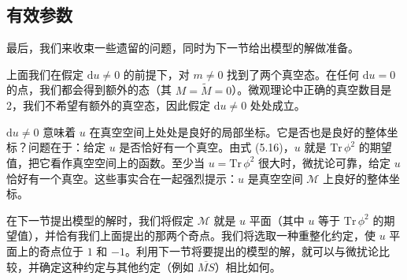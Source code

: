 \documentclass[11pt,a4paper,UTF8,fontset=fandol]{ctexart}
\theoremstyle{plain}
\theoremstyle{definition}
\begin{document}
\subsection{有效参数}

最后，我们来收束一些遗留的问题，同时为下一节给出模型的解做准备。

上面我们在假定 $\mathrm{d}u\neq 0$ 的前提下，对 $m\neq 0$ 找到了两个真空态。在任何 $\mathrm{d}u=0$ 的点，我们都会得到额外的态（其 $M=\widetilde M=0$）。微观理论中正确的真空数目是 2，我们不希望有额外的真空态，因此假定 $\mathrm{d}u\neq 0$ 处处成立。

$\mathrm{d}u\neq 0$ 意味着 $u$ 在真空空间上处处是良好的局部坐标。它是否也是良好的整体坐标？问题在于：给定 $u$ 是否恰好有一个真空。由式 (5.16)，$u$ 就是 $\mathrm{Tr}\,\phi^2$ 的期望值，把它看作真空空间上的函数。至少当 $u=\mathrm{Tr}\,\phi^2$ 很大时，微扰论可靠，给定 $u$ 恰好有一个真空。这些事实合在一起强烈提示：$u$ 是真空空间 $\mathcal M$ 上良好的整体坐标。

在下一节提出模型的解时，我们将假定 $\mathcal M$ 就是 $u$ 平面（其中 $u$ 等于 $\mathrm{Tr}\,\phi^2$ 的期望值），并恰有我们上面提出的那两个奇点。我们将选取一种重整化约定，使 $u$ 平面上的奇点位于 $1$ 和 $-1$。利用下一节将要提出的模型的解，就可以与微扰论比较，并确定这种约定与其他约定（例如 $\overline{MS}$）相比如何。


\end{document}
